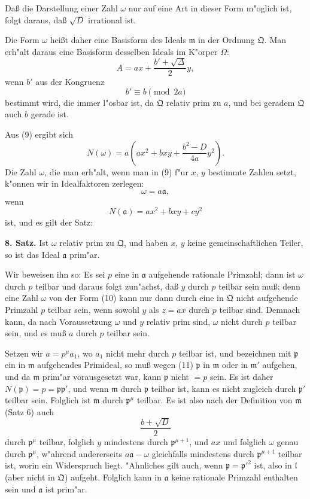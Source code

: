 \documentclass[12pt,a4paper]{article}
\theoremstyle{plain}
\begin{document}
Da\ss{} die Darstellung einer Zahl $\omega$ nur auf eine Art in dieser Form m"oglich ist, folgt daraus, da\ss{} $\sqrt{D}$ irrational ist.

Die Form $\omega$ hei\ss t daher eine Basisform des Ideals $\mathfrak{m}$ in der Ordnung $\mathfrak{Q}$. Man erh"alt daraus eine Basisform desselben Ideals im K"orper $\Omega$:
\[
A = ax + \frac{b' + \sqrt{\Delta}}{2}y,
\]
wenn $b'$ aus der Kongruenz
\[
b' \equiv b \pmod{2a}
\]
bestimmt wird, die immer l"osbar ist, da $\mathfrak{Q}$ relativ prim zu $a$, und bei geradem $\mathfrak{Q}$ auch $b$ gerade ist.

Aus (9) ergibt sich
\begin{equation}
N(\omega) = a\left(ax^2 + bxy + \frac{b^2 - D}{4a}y^2\right).
\tag{12}
\end{equation}
Die Zahl $\omega$, die man erh"alt, wenn man in (9) f"ur $x$, $y$ bestimmte Zahlen setzt, k"onnen wir in Idealfaktoren zerlegen:
\[
\omega = a\mathfrak{a},
\]
wenn
\begin{equation}
N(\mathfrak{a}) = ax^2 + bxy + cy^2
\tag{13}
\end{equation}
ist, und es gilt der Satz:

\textbf{8. Satz.} Ist $\omega$ relativ prim zu $\mathfrak{Q}$, und haben $x$, $y$ keine gemeinschaftlichen Teiler, so ist das Ideal $\mathfrak{a}$ prim"ar.

Wir beweisen ihn so: Es sei $p$ eine in $\mathfrak{a}$ aufgehende rationale Primzahl; dann ist $\omega$ durch $p$ teilbar und daraus folgt zun"achst, da\ss{} $y$ durch $p$ teilbar sein mu\ss{}; denn eine Zahl $\omega$ von der Form (10) kann nur dann durch eine in $\mathfrak{Q}$ nicht aufgehende Primzahl $p$ teilbar sein, wenn sowohl $y$ als $z = ax$ durch $p$ teilbar sind. Demnach kann, da nach Voraussetzung $\omega$ und $y$ relativ prim sind, $\omega$ nicht durch $p$ teilbar sein, und es mu\ss{} $a$ durch $p$ teilbar sein.

Setzen wir $a = p^\mu a_1$, wo $a_1$ nicht mehr durch $p$ teilbar ist, und bezeichnen mit $\mathfrak{p}$ ein in $\mathfrak{m}$ aufgehendes Primideal, so mu\ss{} wegen (11) $\mathfrak{p}$ in $\mathfrak{m}$ oder in $\mathfrak{m}'$ aufgehen, und da $\mathfrak{m}$ prim"ar vorausgesetzt war, kann $\mathfrak{p}$ nicht $= p$ sein. Es ist daher $N(\mathfrak{p}) = p = \mathfrak{p}\mathfrak{p}'$, und wenn $\mathfrak{m}$ durch $\mathfrak{p}$ teilbar ist, kann es nicht zugleich durch $\mathfrak{p}'$ teilbar sein. Folglich ist $\mathfrak{m}$ durch $\mathfrak{p}^\mu$ teilbar. Es ist also nach der Definition von $\mathfrak{m}$ (Satz 6) auch
\[
\frac{b + \sqrt{D}}{2}
\]
durch $\mathfrak{p}^\mu$ teilbar, folglich $y$ mindestens durch $\mathfrak{p}^{\mu+1}$, und $ax$ und folglich $\omega$ genau durch $\mathfrak{p}^\mu$, w"ahrend andererseits $a\mathfrak{a} - \omega$ gleichfalls mindestens durch $\mathfrak{p}^{\mu+1}$ teilbar ist, worin ein Widerspruch liegt. "Ahnliches gilt auch, wenn $\mathfrak{p} = \mathfrak{p}'^2$ ist, also in $\mathfrak{l}$ (aber nicht in $\mathfrak{Q}$) aufgeht. Folglich kann in $\mathfrak{a}$ keine rationale Primzahl enthalten sein und $\mathfrak{a}$ ist prim"ar.
\end{document}
